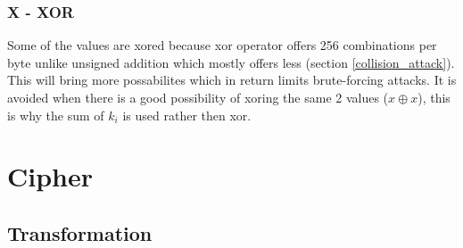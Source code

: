 \documentclass[fleqn, a4paper,12pt]{article}
\begin{document}
\subsubsection{X - XOR} %

Some of the values are xored because xor operator offers 256 combinations per byte unlike unsigned addition which mostly offers less (section \ref{collision_attack}). This will bring more possabilites which in return limits brute-forcing attacks. It is avoided when there is a good possibility of xoring the same 2 values ($x \oplus x$), this is why the sum of $k_i$ is used rather then xor.

\section {Cipher}

\subsection{Transformation}
\end{document}
